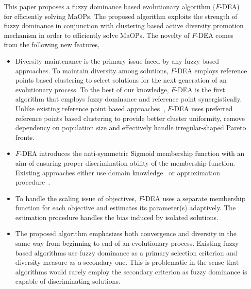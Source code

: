 \documentclass[review]{elsarticle}
\begin{document}
This paper proposes a fuzzy dominance based evolutionary algorithm ($F$-DEA) for efficiently solving MaOPs.  The proposed algorithm exploits the strength of fuzzy dominance in conjunction with clustering based active diversity promotion mechanism in order to efficiently solve MaOPs.
The novelty of $F$-DEA comes from the following new features,

\begin{itemize}
\item Diversity maintenance is the primary issue faced by any fuzzy based approaches. To maintain diversity among solutions, $F$-DEA employs reference points based clustering to select solutions for the next generation of an evolutionary process. To the best of our knowledge, $F$-DEA is the first algorithm that employs fuzzy dominance and reference point  synergistically.
Unlike existing reference point based approaches~\citep{deb2014evolutionary,thetadominance7080938,
	deb2006reference,piceag,referencevectorguided,epcs}, $F$-DEA uses preferred reference points based clustering to provide better cluster uniformity, remove dependency on population size and effectively handle irregular-shaped Pareto fronts.


\item $F$-DEA introduces the anti-symmetric Sigmoid membership function with an aim of  ensuring proper discrimination ability of the membership function. Existing approaches either use domain knowledge~\citep{farina2004fuzzy} or approximation procedure~\citep{he2014fuzzy}.

\item To handle the scaling issue of objectives, $F$-DEA uses a separate membership function for each objective and estimates its parameter(s) adaptively. The estimation procedure handles the bias induced by isolated solutions.

\item The proposed algorithm emphasizes both convergence and diversity in the same way from  beginning to end of an evolutionary process. %
Existing fuzzy based algorithms use fuzzy dominance  as a primary selection criterion and diversity measure  as a secondary one. This is  problematic in the sense that algorithms would rarely employ the secondary criterion as fuzzy dominance is capable of discriminating solutions.


\end{itemize}
\end{document}
